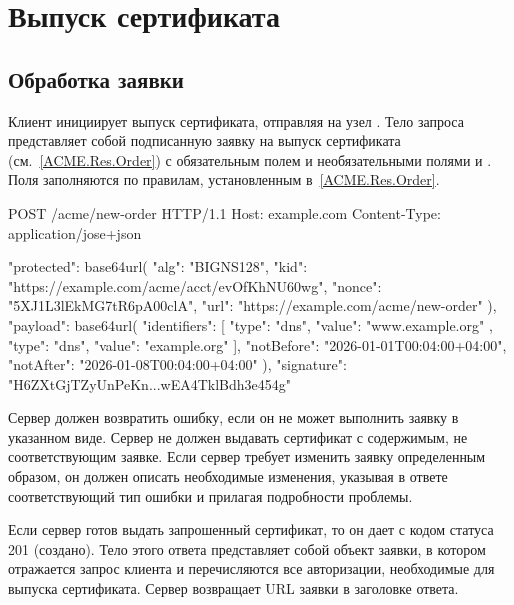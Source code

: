\section{Выпуск сертификата}\label{ACME.Order}

\subsection{Обработка заявки}\label{ACME.Order.Apply}

Клиент инициирует выпуск сертификата, отправляя 
 на узел . Тело запроса 
представляет собой подписанную заявку на выпуск сертификата 
(см.~\ref{ACME.Res.Order}) с обязательным полем  и 
необязательными полями  и . 
%
Поля заполняются по правилам, установленным в~\ref{ACME.Res.Order}.

\begin{codeblock}
POST /acme/new-order HTTP/1.1
Host: example.com
Content-Type: application/jose+json

{
  "protected": base64url({
    "alg": "BIGNS128",
    "kid": "https://example.com/acme/acct/evOfKhNU60wg",
    "nonce": "5XJ1L3lEkMG7tR6pA00clA",
    "url": "https://example.com/acme/new-order"
  }),
  "payload": base64url({
    "identifiers": [
      { "type": "dns", "value": "www.example.org" },
      { "type": "dns", "value": "example.org" }
    ],
    "notBefore": "2026-01-01T00:04:00+04:00",
    "notAfter": "2026-01-08T00:04:00+04:00"
  }),
  "signature": "H6ZXtGjTZyUnPeKn...wEA4TklBdh3e454g"
}
\end{codeblock}
\fi

Сервер должен возвратить ошибку, если он не может выполнить заявку в указанном 
виде. Сервер не должен выдавать сертификат с содержимым, не соответствующим 
заявке.
%
Если сервер требует изменить заявку определенным образом, он должен описать 
необходимые изменения, указывая в ответе соответствующий тип ошибки и прилагая 
подробности проблемы. 

Если сервер готов выдать запрошенный сертификат, то он дает
 с кодом статуса 201 (создано). Тело этого
ответа представляет собой объект заявки, в котором отражается запрос клиента и
перечисляются все авторизации, необходимые для выпуска сертификата.
%
Сервер возвращает URL заявки в заголовке  ответа.

   
